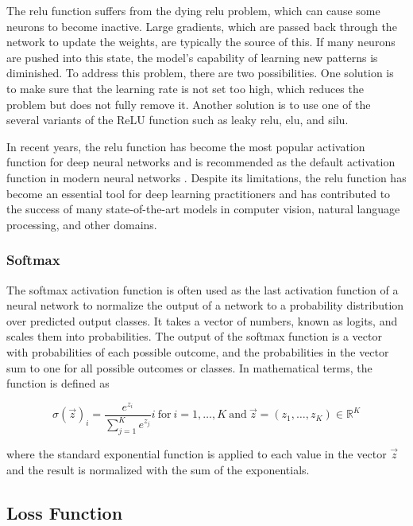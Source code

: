 \documentclass[final]{vutinfth} %
\begin{document}
The \gls{relu} function suffers from the dying \gls{relu} problem,
which can cause some neurons to become inactive. Large gradients,
which are passed back through the network to update the weights, are
typically the source of this. If many neurons are pushed into this
state, the model's capability of learning new patterns is
diminished. To address this problem, there are two possibilities. One
solution is to make sure that the learning rate is not set too high,
which reduces the problem but does not fully remove it. Another
solution is to use one of the several variants of the ReLU function
such as leaky \gls{relu}, \gls{elu}, and \gls{silu}.

In recent years, the \gls{relu} function has become the most popular
activation function for deep neural networks and is recommended as the
default activation function in modern neural networks
\cite{goodfellow2016}. Despite its limitations, the \gls{relu}
function has become an essential tool for deep learning practitioners
and has contributed to the success of many state-of-the-art models in
computer vision, natural language processing, and other domains.

\subsubsection{Softmax}
\label{sssec:theory-softmax}

The softmax activation function is often used as the last activation
function of a neural network to normalize the output of a network to a
probability distribution over predicted output classes. It takes a
vector of numbers, known as logits, and scales them into
probabilities. The output of the softmax function is a vector with
probabilities of each possible outcome, and the probabilities in the
vector sum to one for all possible outcomes or classes. In
mathematical terms, the function is defined as

\begin{equation}
  \label{eq:softmax}
  \sigma(\vec{z})_{i} = \frac{e^{z_i}}{\sum_{j=1}^Ke^{z_j}}i\ \mathrm{for}\ i = 1,\dots,K\ \mathrm{and}\ \vec{z} = (z_1,\dots,z_K)\in\mathbb{R}^K
\end{equation}

where the standard exponential function is applied to each value in
the vector $\vec{z}$ and the result is normalized with the sum of the
exponentials.

\subsection{Loss Function}
\label{ssec:theory-loss-function}
\end{document}
